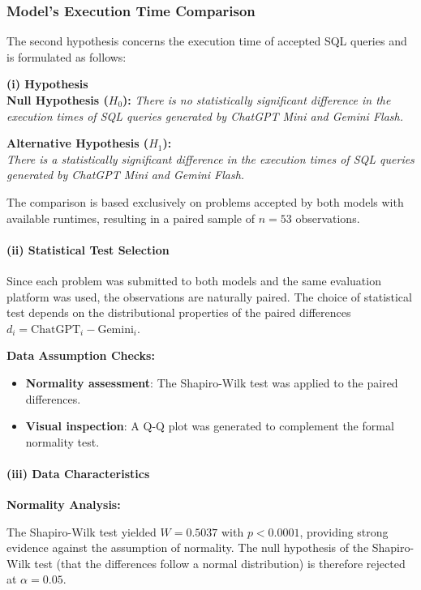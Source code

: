 \documentclass[11pt,a4paper]{article}
\begin{document}
 \subsubsection{Model's Execution Time Comparison}

    The second hypothesis concerns the execution time of accepted SQL queries and is formulated as follows:

    \textbf{(i) Hypothesis}\\
    \textbf{Null Hypothesis ($H_0$):}
    \textit{There is no statistically significant difference in the execution times of SQL queries generated by ChatGPT Mini and Gemini Flash.}

    \textbf{Alternative Hypothesis ($H_1$):} \\
    \textit{There is a statistically significant difference in the execution times of SQL queries generated by ChatGPT Mini and Gemini Flash.}

    The comparison is based exclusively on problems accepted by both models with available runtimes, resulting in a paired sample of $n = 53$ observations.

    \paragraph{(ii) Statistical Test Selection}
    \quad

    Since each problem was submitted to both models and the same evaluation platform was used, the observations are naturally paired. The choice of statistical test depends on the distributional properties of the paired differences $d_i = \text{ChatGPT}_i - \text{Gemini}_i$.

    \textbf{Data Assumption Checks:}
    \begin{itemize}
        \item \textbf{Normality assessment}: The Shapiro-Wilk test was applied to the paired differences.
        \item \textbf{Visual inspection}: A Q-Q plot was generated to complement the formal normality test.
    \end{itemize}

    \paragraph{(iii) Data Characteristics}
    \quad

    \textbf{Normality Analysis:}

    The Shapiro-Wilk test yielded $W = 0.5037$ with $p < 0.0001$, providing strong evidence against the assumption of normality. The null hypothesis of the Shapiro-Wilk test (that the differences follow a normal distribution) is therefore rejected at $\alpha = 0.05$.
\end{document}
